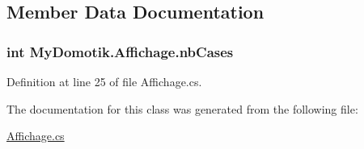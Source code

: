 \subsection{Member Data Documentation}
\subsubsection[{\texorpdfstring{nb\+Cases}{nbCases}}]{\setlength{\rightskip}{0pt plus 5cm}int My\+Domotik.\+Affichage.\+nb\+Cases\hspace{0.3cm}{\ttfamily [private]}}\hypertarget{class_my_domotik_1_1_affichage_a8a227cc856685b6daf0472277bccdfd3}{}\label{class_my_domotik_1_1_affichage_a8a227cc856685b6daf0472277bccdfd3}


Definition at line 25 of file Affichage.\+cs.



The documentation for this class was generated from the following file\+:\begin{DoxyCompactItemize}
\item 
\hyperlink{_affichage_8cs}{Affichage.\+cs}\end{DoxyCompactItemize}
